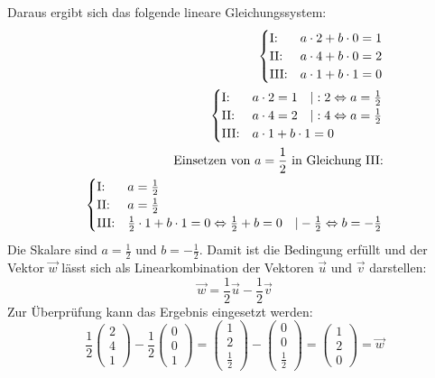 Daraus ergibt sich das folgende lineare Gleichungssystem:
\begin{align*}
    \begin{cases}
        \text{I:\@} & a \cdot 2 + b \cdot 0 = 1 \\
        \text{II:\@} & a \cdot 4 + b \cdot 0 = 2 \\
        \text{III:\@} & a \cdot 1 + b \cdot 1 = 0
    \end{cases} \\
    \begin{cases}
        \text{I:\@} & a \cdot 2 = 1 \quad | : 2 \Leftrightarrow a = \frac{1}{2}\\
        \text{II:\@} & a \cdot 4 = 2 \quad | : 4 \Leftrightarrow a = \frac{1}{2}\\
        \text{III:\@} & a \cdot 1 + b \cdot 1 = 0
    \end{cases} \\
    \text{Einsetzen von } a=\frac{1}{2} \text{ in Gleichung III:} \\
    \begin{cases}
        \text{I:\@} & a = \frac{1}{2}\\
        \text{II:\@} & a = \frac{1}{2}\\
        \text{III:\@} & \frac{1}{2} \cdot 1 + b \cdot 1 = 0 \Leftrightarrow \frac{1}{2} + b = 0 \quad |- \frac{1}{2} \Leftrightarrow b = -\frac{1}{2}
    \end{cases}
\end{align*}
Die Skalare sind $a = \frac{1}{2}$ und $b = -\frac{1}{2}$. Damit ist die Bedingung erfüllt und der Vektor $\vec{w}$ lässt sich als Linearkombination der Vektoren $\vec{u}$ und $\vec{v}$ darstellen:
$$ \vec{w} = \frac{1}{2} \vec{u} - \frac{1}{2} \vec{v} $$
Zur Überprüfung kann das Ergebnis eingesetzt werden:
$$ \frac{1}{2} \begin{pmatrix} 2 \\ 4 \\ 1 \end{pmatrix} - \frac{1}{2} \begin{pmatrix} 0 \\ 0 \\ 1 \end{pmatrix} = \begin{pmatrix} 1 \\ 2 \\ \frac{1}{2} \end{pmatrix} - \begin{pmatrix} 0 \\ 0 \\ \frac{1}{2} \end{pmatrix} = \begin{pmatrix} 1 \\ 2 \\ 0 \end{pmatrix} = \vec{w} $$